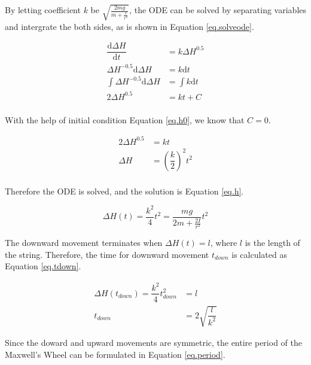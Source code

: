\documentclass[a4paper]{article}
\begin{document}
By letting coefficient $k$ be $\sqrt{\frac{2mg}{m+\frac{I}{r^2}}}$, the ODE can be solved by separating variables and intergrate the both sides, as is shown in Equation \ref{eq.solveode}.

\begin{equation}
    \label{eq.solveode}
    \begin{aligned}
        \dfrac{\mathrm{d}\Delta H}{\mathrm{d}t} &= k \Delta H ^ {0.5}\\
        \Delta H ^ {-0.5} \mathrm{d}\Delta H  &= k\mathrm{d}t \\
        \int \Delta H ^ {-0.5} \mathrm{d}\Delta H &= \int k\mathrm{d}t \\
        2\Delta H ^ {0.5} &= k t + C\\
    \end{aligned}
\end{equation}

With the help of initial condition Equation \ref{eq.h0}, we know that $C = 0$. 

\begin{equation}
    \begin{aligned}
        2\Delta H ^ {0.5} &= k t \\
        \Delta H  &= (\dfrac{k}{2})^2 t^2 \\
    \end{aligned}
\end{equation}

Therefore the ODE is solved, and the solution is Equation \ref{eq.h}.

\begin{equation}\label{eq.h}
    \Delta H(t) = \dfrac{k^2}{4} t^2 = \dfrac{mg}{2m+\frac{2I}{r^2}} t^2
\end{equation}

The downward movement terminates when $\Delta H(t) = l$, where $l$ is the length of the string. Therefore, the time for downward movement $t_{down}$ is calculated as Equation \ref{eq.tdown}.

\begin{equation}\label{eq.tdown}
    \begin{aligned}
        \Delta H(t_{down}) = \dfrac{k^2}{4} t_{down}^2 &= l\\
        t_{down} &= 2\sqrt{\dfrac{l}{k^2}}
    \end{aligned}
\end{equation}

Since the doward and upward movements are symmetric, the entire period of the Maxwell's Wheel can be formulated in Equation \ref{eq.period}.
\end{document}
